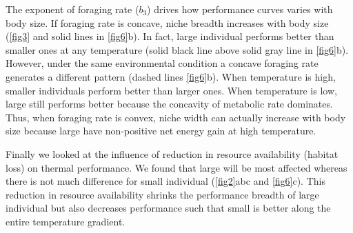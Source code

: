 The exponent of foraging rate ($b_3$) drives how performance curves varies with body size.
If foraging rate is concave, niche breadth increases with body size (\cref{fig3} and solid lines in \cref{fig6}b).
In fact, large individual performs better than smaller ones at any temperature (solid black line above solid gray line in \cref{fig6}b).
However, under the same environmental condition a concave foraging rate generates a different pattern (dashed lines \cref{fig6}b).
When temperature is high, smaller individuals perform better than larger ones.
When temperature  is low,  large still performs better because the concavity of metabolic rate dominates.
Thus, when foraging rate is convex, niche width can actually increase with body size because large have non-positive net energy gain at high temperature. 
   
Finally we looked at the influence of reduction in resource availability (habitat loss) on thermal performance.
We found that large will be most affected whereas there is not much difference for small individual (\cref{fig2}abc and \cref{fig6}c).
 This reduction in resource availability shrinks the performance breadth of large individual but also decreases performance such that small is better along the entire temperature gradient.
